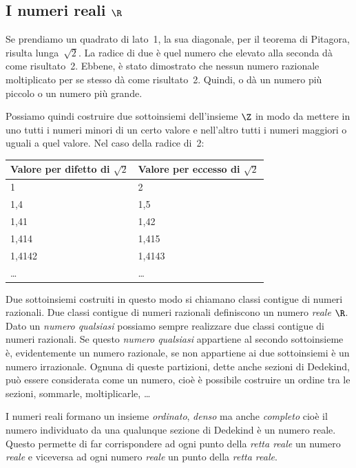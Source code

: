 \subsection{I numeri reali $\R$}
\label{subsec:insnum_reali}

Se prendiamo un quadrato di lato~1, la sua diagonale, per il teorema di 
Pitagora, risulta lunga~$\sqrt{2}$. 
La radice di due è quel numero che elevato alla seconda dà come risultato~2.
Ebbene, è stato dimostrato che nessun numero razionale moltiplicato per se 
stesso dà come risultato~2. Quindi, o dà un numero più piccolo o un numero 
più 
grande.

Possiamo quindi costruire due sottoinsiemi dell'insieme $\Z$ in modo da 
mettere 
in uno tutti i numeri minori di un certo valore e nell'altro tutti i numeri 
maggiori o uguali a quel valore. Nel caso della radice di~2:

\begin{center}
 \begin{tabular}{ll}
\toprule
Valore per difetto di $\sqrt{2}$ &Valore per eccesso di $\sqrt{2}$ \\
\midrule
1& 2\\
1,4& 1,5 \\
1,41& 1,42\\
1,414& 1,415\\
1,4142& 1,4143\\
\ldots& \ldots\\
\bottomrule
\end{tabular}
\end{center}

Due sottoinsiemi costruiti in questo modo si chiamano classi contigue di 
numeri razionali. Due classi contigue di numeri razionali definiscono un 
numero 
\emph{reale} $\R$. Dato un \emph{numero qualsiasi} possiamo sempre 
realizzare 
due classi contigue di numeri razionali. Se questo \emph{numero qualsiasi} 
appartiene al secondo sottoinsieme è, evidentemente un numero razionale, se 
non 
appartiene ai due sottoinsiemi è un numero irrazionale. Ognuna di queste 
partizioni, dette anche sezioni di Dedekind, può essere considerata come un
numero, cioè è possibile costruire un ordine tra le sezioni, sommarle, 
moltiplicarle, \dots

I numeri reali formano un insieme \emph{ordinato}, \emph{denso} ma anche 
\emph{completo} cioè il numero individuato da una qualunque sezione di 
Dedekind è un numero reale.
Questo permette di far corrispondere ad ogni punto della \emph{retta reale} 
un numero \emph{reale} e viceversa ad ogni numero \emph{reale} un punto 
della \emph{retta reale}. 

